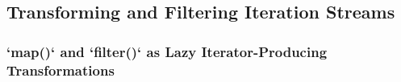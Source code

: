 \subsection{Transforming and Filtering Iteration Streams}
\subsubsection{`map()` and `filter()` as Lazy Iterator-Producing Transformations}

